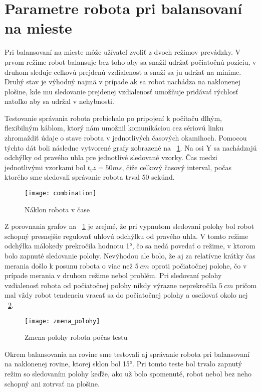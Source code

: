 \section{Parametre robota pri balansovaní na mieste}
Pri balansovaní na mieste môže užívateľ zvoliť z dvoch režimov prevádzky. V prvom režime robot balansuje bez toho aby sa snažil udržať počiatočnú pozíciu, v druhom sleduje celkovú prejdenú vzdialenosť a snaží sa ju udržať na minime. Druhý stav je výhodný najmä v prípade ak sa robot nachádza na naklonenej plošine, kde mu sledovanie prejdenej vzdialenosť umožňuje pridávať rýchlosť natoľko aby sa udržal v nehybnosti.

Testovanie správania robota prebiehalo po pripojení k počítaču dlhým, flexibilným káblom, ktorý nám umožnil komunikáciou cez sériovú linku zhromaždiť údaje o stave robota v jednotlivých časových okamihoch. Pomocou týchto dát boli následne vytvorené grafy zobrazené na  \figurename~\ref{fig:combination}. Na osi Y sa nachádzajú odchýlky od pravého uhla pre jednotlivé sledované vzorky. Čas medzi jednotlivými vzorkami bol $t_vz = 50ms$, čiže celkový časový interval, počas ktorého sme sledovali správanie robota trval 50 sekúnd.



\begin{figure}[h]
\centering
\texttt{[image: combination]}
\caption{Náklon robota v čase}
\label{fig:combination}
\end{figure}   

Z porovnania grafov na \figurename~\ref{fig:combination} je zrejmé, že pri vypnutom sledovaní polohy bol robot schopný presnejšie regulovať uhlovú odchýlku od pravého uhla. V tomto režime odchýlka málokedy prekročila hodnotu 1°, čo sa nedá povedať o režime, v ktorom bolo zapnuté sledovanie polohy. Nevýhodou ale bolo, že aj za relatívne krátky čas merania došlo k posunu robota o viac než $5~cm$ oproti počiatočnej polohe, čo v prípade merania v druhom režime nebol problém. Pri sledovaní polohy vzdialenosť robota od počiatočnej polohy nikdy výrazne neprekročila $5~cm$ pričom mal vždy robot tendenciu vracať sa do počiatočnej polohy a oscilovať okolo nej \figurename~\ref{fig:zmena_polohy}.
 
\begin{figure}[h!]
\centering
\texttt{[image: zmena\_polohy]}
\caption{Zmena polohy robota počas testu}
\label{fig:zmena_polohy}
\end{figure}   

Okrem balansovania na rovine sme testovali aj správanie robota pri balansovaní na naklonenej rovine, ktorej sklon bol 15°. Pri tomto teste bol trvalo zapnutý režim so sledovaním polohy keďže, ako už bolo spomenuté, robot nebol bez neho schopný ani zotrvať na plošine. 

